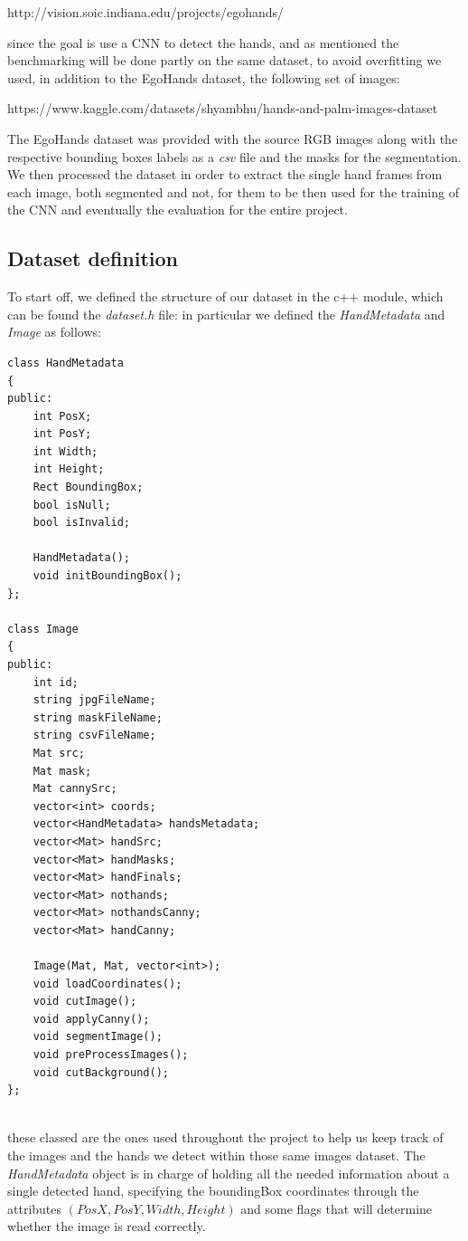 http://vision.soic.indiana.edu/projects/egohands/

since the goal is use a CNN to detect the hands, and as mentioned the benchmarking will be done partly on the same dataset, to avoid overfitting we used, in addition to the EgoHands dataset, 
the following set of images:

https://www.kaggle.com/datasets/shyambhu/hands-and-palm-images-dataset

The EgoHands dataset was provided with the source RGB images along with the respective bounding boxes labels as a \textit{csv} file and the masks for the segmentation. We then processed 
the dataset in order to extract the single hand frames from each image, both segmented and not, for them to be then used for the training of the CNN and eventually the evaluation for the entire 
project. 


\subsection{Dataset definition}

To start off, we defined the structure of our dataset in the c++ module, which can be found the \textit{dataset.h} file: in particular we defined the \textit{HandMetadata} and \textit{Image}
as follows: 

\begin{lstlisting}[]
    class HandMetadata
{
public:
    int PosX;
    int PosY;
    int Width;
    int Height;
    Rect BoundingBox;
    bool isNull;
    bool isInvalid;

    HandMetadata();
    void initBoundingBox();
};

class Image
{
public:
    int id;
    string jpgFileName;
    string maskFileName;
    string csvFileName;
    Mat src;
    Mat mask;
    Mat cannySrc;
    vector<int> coords;
    vector<HandMetadata> handsMetadata;
    vector<Mat> handSrc;
    vector<Mat> handMasks;
    vector<Mat> handFinals;
    vector<Mat> nothands;
    vector<Mat> nothandsCanny;
    vector<Mat> handCanny;

    Image(Mat, Mat, vector<int>);
    void loadCoordinates();
    void cutImage();
    void applyCanny();
    void segmentImage();
    void preProcessImages();
    void cutBackground();
};


\end{lstlisting}

these classed are the ones used throughout the project to help us keep track of the images and the hands we detect within those same images dataset.
The \textit{HandMetadata} object is in charge of holding all the needed information about a single detected hand, specifying the boundingBox coordinates 
through the attributes $(PosX, PosY, Width, Height)$ and some flags that will determine whether the image is read correctly.

